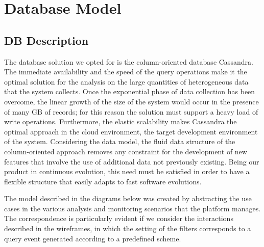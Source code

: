\documentclass[../main.tex]{subfiles}
\begin{document}
    \section{Database Model}
    \subsection{DB Description}
    The database solution we opted for is the column-oriented database Cassandra.
    The immediate availability and the speed of the query operations make it the optimal solution for the analysis on the large quantities of heterogeneous data that the system collects. Once the exponential phase of data collection has been overcome, the linear growth of the size of the system would occur in the presence of many GB of records; for this reason the solution must support a heavy load of write operations. Furthermore, the elastic scalability makes Cassandra the optimal approach in the cloud environment, the target development environment of the system. Considering the data model, the fluid data structure of the column-oriented approach removes any constraint for the development of new features that involve the use of additional data not previously existing. Being our product in continuous evolution, this need must be satisfied in order to have a flexible structure that easily adapts to fast software evolutions.

    The model described in the diagrams below was created by abstracting the use cases in the various analysis and monitoring scenarios that the platform manages. The correspondence is particularly evident if we consider the interactions described in the wireframes, in which the setting of the filters corresponds to a query event generated according to a predefined scheme.
\end{document}
